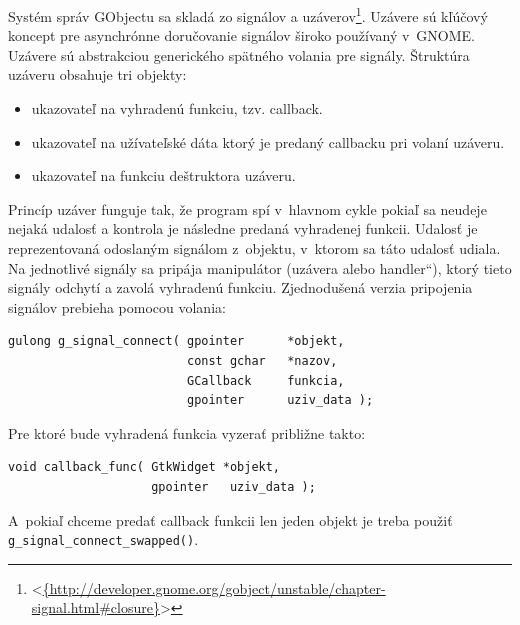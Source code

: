 \documentclass[12pt,oneside,final]{fithesis2}
\newcommand\uv[1]{\quotedblbase #1\textquotedblleft}
\begin{document}
Systém správ GObjectu sa skladá zo signálov a uzáverov\footnote{<\url{{http://developer.gnome.org/gobject/unstable/chapter-signal.html\#closure}}>}. Uzávere sú kľúčový koncept pre asynchrónne doručovanie signálov široko používaný v~GNOME. Uzávere sú abstrakciou generického spätného volania pre signály. Štruktúra uzáveru obsahuje tri objekty:
\begin{itemize}
\item ukazovateľ na vyhradenú funkciu, tzv. callback.
\item ukazovateľ na užívateľské dáta ktorý je predaný callbacku pri volaní uzáveru.
\item ukazovateľ na funkciu deštruktora uzáveru.
\end{itemize}
Princíp uzáver funguje tak, že program spí v~hlavnom cykle pokiaľ sa neudeje nejaká udalosť a kontrola je následne predaná vyhradenej funkcii. Udalosť je reprezentovaná odoslaným signálom z~objektu, v~ktorom sa táto udalosť udiala. Na jednotlivé signály sa pripája manipulátor (uzávera alebo \uv{handler}), ktorý tieto signály odchytí a zavolá vyhradenú funkciu. Zjednodušená verzia pripojenia signálov prebieha pomocou volania:
\begin{verbatim}
gulong g_signal_connect( gpointer      *objekt,
                         const gchar   *nazov,
                         GCallback     funkcia,
                         gpointer      uziv_data );
\end{verbatim} Pre ktoré bude vyhradená funkcia vyzerať približne takto: 
\begin{verbatim}
void callback_func( GtkWidget *objekt,
                    gpointer   uziv_data );
\end{verbatim}
A~pokiaľ chceme predať callback funkcii len jeden objekt je treba použiť \texttt{g\_signal\_connect\_swapped()}.
\end{document}
